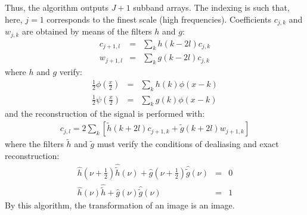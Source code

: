Thus, the algorithm outputs $J+1$ subband arrays.
The indexing is such that,
here, $j = 1$ corresponds to the finest scale (high frequencies).
Coefficients $c_{j,k}$ and $w_{j,k}$ are obtained by means of the filters
$h$ and $g$:
\begin{eqnarray}
c_{j+1,l} & = & \sum_k h(k-2l) c_{j,k} \nonumber \\
w_{j+1,l} & = & \sum_k g(k-2l) c_{j,k}
\end{eqnarray}
where $h$ and $g$ verify:
\begin{eqnarray}
\frac{1}{2} \phi(\frac{x}{2}) & = &  \sum_k h(k) \phi(x-k) \nonumber \\
\frac{1}{2} \psi(\frac{x}{2}) & = & \sum_k g(k) \phi(x-k)
\end{eqnarray}
and the reconstruction of the signal is performed with:
\begin{eqnarray}
c_{j,l} = 2 \sum_k [ \tilde h(k+2l) c_{j+1,k}  + \tilde g(k+2l) w_{j+1,k}  ]
\end{eqnarray}
where the filters $\tilde h$ and $\tilde g$ must verify the conditions of
dealiasing and exact reconstruction:
\begin{eqnarray}
\hat{h}(\nu+\frac{1}{2}) \hat{\tilde h}(\nu) + \hat{g}(\nu+\frac{1}{2}) \hat{\tilde g}(\nu)  & = & 0 \nonumber \\
\hat{h}(\nu) \hat{\tilde h} + \hat{g}(\nu) \hat{\tilde g}(\nu)  & = & 1  
\end{eqnarray}
By this algorithm, the transformation of an image is an image. 


